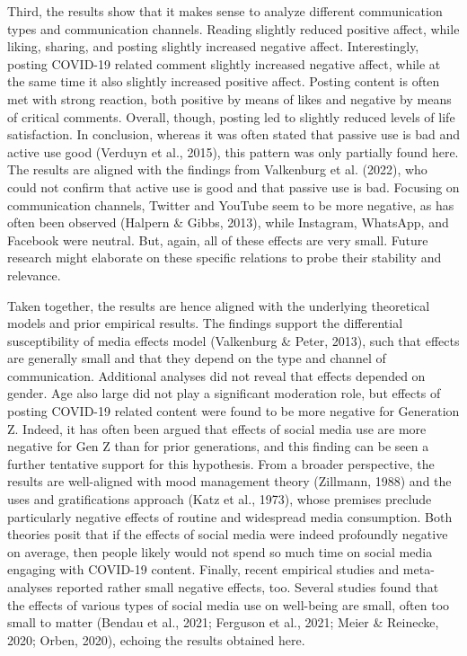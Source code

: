 \documentclass[
  man,mask,floatsintext]{apa7}
\begin{document}
Third, the results show that it makes sense to analyze different communication types and communication channels.
Reading slightly reduced positive affect, while liking, sharing, and posting slightly increased negative affect.
Interestingly, posting COVID-19 related comment slightly increased negative affect, while at the same time it also slightly increased positive affect.
Posting content is often met with strong reaction, both positive by means of likes and negative by means of critical comments.
Overall, though, posting led to slightly reduced levels of life satisfaction.
In conclusion, whereas it was often stated that passive use is bad and active use good (Verduyn et al., 2015), this pattern was only partially found here.
The results are aligned with the findings from Valkenburg et al. (2022), who could not confirm that active use is good and that passive use is bad.
Focusing on communication channels, Twitter and YouTube seem to be more negative, as has often been observed (Halpern \& Gibbs, 2013), while Instagram, WhatsApp, and Facebook were neutral.
But, again, all of these effects are very small.
Future research might elaborate on these specific relations to probe their stability and relevance.

Taken together, the results are hence aligned with the underlying theoretical models and prior empirical results.
The findings support the differential susceptibility of media effects model (Valkenburg \& Peter, 2013), such that effects are generally small and that they depend on the type and channel of communication.
Additional analyses did not reveal that effects depended on gender.
Age also large did not play a significant moderation role, but effects of posting COVID-19 related content were found to be more negative for Generation Z.
Indeed, it has often been argued that effects of social media use are more negative for Gen Z than for prior generations, and this finding can be seen a further tentative support for this hypothesis.
From a broader perspective, the results are well-aligned with mood management theory (Zillmann, 1988) and the uses and gratifications approach (Katz et al., 1973), whose premises preclude particularly negative effects of routine and widespread media consumption.
Both theories posit that if the effects of social media were indeed profoundly negative on average, then people likely would not spend so much time on social media engaging with COVID-19 content.
Finally, recent empirical studies and meta-analyses reported rather small negative effects, too.
Several studies found that the effects of various types of social media use on well-being are small, often too small to matter (Bendau et al., 2021; Ferguson et al., 2021; Meier \& Reinecke, 2020; Orben, 2020), echoing the results obtained here.
\end{document}
